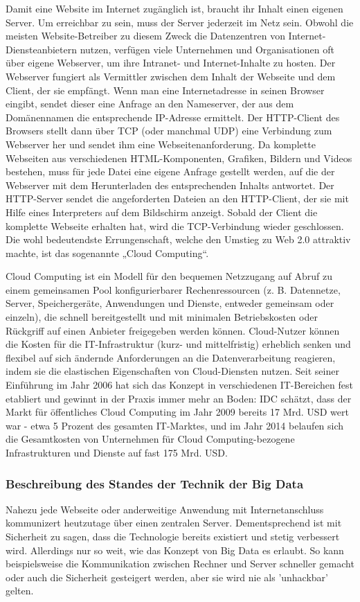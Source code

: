 Damit eine Website im Internet zugänglich ist, braucht ihr Inhalt einen eigenen Server.
Um erreichbar zu sein, muss der Server jederzeit im Netz sein.
Obwohl die meisten Website-Betreiber zu diesem Zweck die Datenzentren von Internet-Diensteanbietern nutzen, verfügen viele Unternehmen und Organisationen oft über eigene Webserver, um ihre Intranet- und Internet-Inhalte zu hosten.
Der Webserver fungiert als Vermittler zwischen dem Inhalt der Webseite und dem Client, der sie empfängt.
Wenn man eine Internetadresse in seinen Browser eingibt, sendet dieser eine Anfrage an den Nameserver, der aus dem Domänennamen die entsprechende IP-Adresse ermittelt.
Der HTTP-Client des Browsers stellt dann über TCP (oder manchmal UDP) eine Verbindung zum Webserver her und sendet ihm eine Webseitenanforderung.
Da komplette Webseiten aus verschiedenen HTML-Komponenten, Grafiken, Bildern und Videos bestehen, muss für jede Datei eine eigene Anfrage gestellt werden, auf die der Webserver mit dem Herunterladen des entsprechenden Inhalts antwortet.
Der HTTP-Server sendet die angeforderten Dateien an den HTTP-Client, der sie mit Hilfe eines Interpreters auf dem Bildschirm anzeigt. Sobald der Client die komplette Webseite erhalten hat, wird die TCP-Verbindung wieder geschlossen.
Die wohl bedeutendste Errungenschaft, welche den Umstieg zu Web 2.0 attraktiv machte, ist das sogenannte „Cloud Computing“.

Cloud Computing ist ein Modell für den bequemen Netzzugang auf Abruf zu einem gemeinsamen Pool konfigurierbarer Rechenressourcen (z. B. Datennetze, Server, Speichergeräte, Anwendungen und Dienste, entweder gemeinsam oder einzeln), die schnell bereitgestellt und mit minimalen Betriebskosten oder Rückgriff auf einen Anbieter freigegeben werden können.
Cloud-Nutzer können die Kosten für die IT-Infrastruktur (kurz- und mittelfristig) erheblich senken und flexibel auf sich ändernde Anforderungen an die Datenverarbeitung reagieren, indem sie die elastischen Eigenschaften von Cloud-Diensten nutzen.
Seit seiner Einführung im Jahr 2006 hat sich das Konzept in verschiedenen IT-Bereichen fest etabliert und gewinnt in der Praxis immer mehr an Boden: IDC schätzt, dass der Markt für öffentliches Cloud Computing im Jahr 2009 bereits 17 Mrd. USD wert war - etwa 5 Prozent des gesamten IT-Marktes, und im Jahr 2014 belaufen sich die Gesamtkosten von Unternehmen für Cloud Computing-bezogene Infrastrukturen und Dienste auf fast 175 Mrd. USD.


\subsubsection{Beschreibung des Standes der Technik der Big Data}
Nahezu jede Webseite oder anderweitige Anwendung mit Internetanschluss kommunizert heutzutage über einen zentralen Server.
Dementsprechend ist mit Sicherheit zu sagen, dass die Technologie bereits existiert und stetig verbessert wird.
Allerdings nur so weit, wie das Konzept von Big Data es erlaubt.
So kann beispielsweise die Kommunikation zwischen Rechner und Server schneller gemacht oder auch die Sicherheit gesteigert werden, aber sie wird nie als 'unhackbar' gelten.

